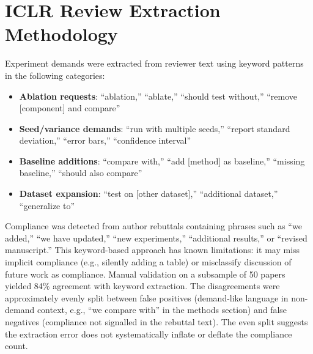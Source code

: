 \documentclass{article}
\begin{document}
\section{ICLR Review Extraction Methodology}
\label{app:iclr_method}

Experiment demands were extracted from reviewer text using keyword patterns in the following categories:
\begin{itemize}[leftmargin=*]
\item \textbf{Ablation requests}: ``ablation,'' ``ablate,'' ``should test without,'' ``remove [component] and compare''
\item \textbf{Seed/variance demands}: ``run with multiple seeds,'' ``report standard deviation,'' ``error bars,'' ``confidence interval''
\item \textbf{Baseline additions}: ``compare with,'' ``add [method] as baseline,'' ``missing baseline,'' ``should also compare''
\item \textbf{Dataset expansion}: ``test on [other dataset],'' ``additional dataset,'' ``generalize to''
\end{itemize}
Compliance was detected from author rebuttals containing phrases such as ``we added,'' ``we have updated,'' ``new experiments,'' ``additional results,'' or ``revised manuscript.'' This keyword-based approach has known limitations: it may miss implicit compliance (e.g., silently adding a table) or misclassify discussion of future work as compliance. Manual validation on a subsample of 50 papers yielded 84\% agreement with keyword extraction. The disagreements were approximately evenly split between false positives (demand-like language in non-demand context, e.g., ``we compare with'' in the methods section) and false negatives (compliance not signalled in the rebuttal text). The even split suggests the extraction error does not systematically inflate or deflate the compliance count.
\end{document}
